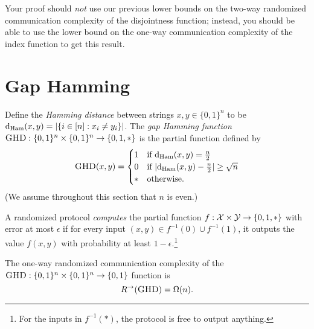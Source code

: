 \begin{remark}
	Your proof should \emph{not} use our previous lower bounds on the two-way randomized communication complexity of the disjointness function; instead, you should be able to use the lower bound on the one-way communication complexity of the index function to get this result.
\end{remark}




\section{Gap Hamming}

Define the \emph{Hamming distance} between strings $x,y \in \{0,1\}^n$ to be $\mathrm{d}_{\mathrm{Ham}}(x,y) = |\{i \in [n] : x_i \neq y_i\}|$.
The \emph{gap Hamming function} $\textsc{GHD} : \{0,1\}^n \times \{0,1\}^n \to \{0,1,*\}$ is the partial function defined by
\[
\textsc{GHD}(x,y) = \begin{cases}
1 & \mbox{if } \mathrm{d}_{\mathrm{Ham}}(x,y) = \frac n2 \\
0 & \mbox{if } |\mathrm{d}_{\mathrm{Ham}}(x,y) - \frac n2| \ge \sqrt{n} \\
* & \mbox{otherwise.}
\end{cases}
\] 
(We assume throughout this section that $n$ is even.)

\begin{definition}
	A randomized protocol \emph{computes} the partial function $f : \mathcal{X} \times \mathcal{Y} \to \{0,1,*\}$ with error at most $\epsilon$ if for every input $(x,y) \in f^{-1}(0) \cup f^{-1}(1)$, it outputs the value $f(x,y)$ with probability at least $1-\epsilon$.\footnote{For the inputs in $f^{-1}(*)$, the protocol is free to output anything.}
\end{definition}

\begin{theorem}
	The one-way randomized communication complexity of the $\textsc{GHD} : \{0,1\}^n \times \{0,1\}^n \to \{0,1\}$ function is
	\[
	R^\rightarrow(\textsc{GHD}) = \Omega(n).
	\]
\end{theorem}

